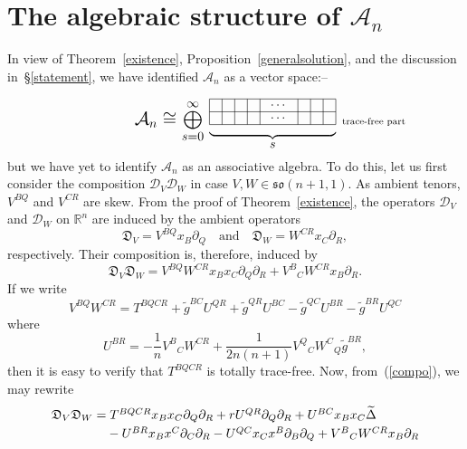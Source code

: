 \documentclass[a4paper,12pt]{amsart}
\begin{document}
\section{The algebraic structure of ${\mathcal A}_n$}
\label{algebraicstructure}
In view of Theorem~\ref{existence}, Proposition~\ref{generalsolution}, and the
discussion in~\S\ref{statement}, we have identified ${\mathcal A}_n$ as a
vector space:--
\begin{equation}\label{Aasvectorspace}\raisebox{5pt}
{\Large $\displaystyle{\mathcal A}_n\cong\bigoplus_{s=0}^\infty$}\;
\underbrace{\begin{picture}(100,30)
\put(0,5){\line(1,0){100}}
\put(0,15){\line(1,0){100}}
\put(0,25){\line(1,0){100}}
\put(0,5){\line(0,1){20}}
\put(10,5){\line(0,1){20}}
\put(20,5){\line(0,1){20}}
\put(30,5){\line(0,1){20}}
\put(40,5){\line(0,1){20}}
\put(70,5){\line(0,1){20}}
\put(80,5){\line(0,1){20}}
\put(90,5){\line(0,1){20}}
\put(100,5){\line(0,1){20}}
\put(55,10){\makebox(0,0){$\cdots$}}
\put(55,20){\makebox(0,0){$\cdots$}}
\put(105,7){\makebox(0,0)[l]{\scriptsize trace-free part}}
\end{picture}}_{\mbox{$s$}}\end{equation}
but we have yet to identify ${\mathcal A}_n$ as an associative algebra. To do
this, let us first consider the composition ${\mathcal D}_V{\mathcal D}_W$ in
case $V,W\in{\mathfrak{so}}(n+1,1)$. As ambient tenors, $V^{BQ}$ and $V^{CR}$
are skew. {From} the proof of Theorem~\ref{existence}, the operators
${\mathcal D}_V$ and ${\mathcal D}_W$ on ${\mathbb R}^n$ are induced by the
ambient operators
$${\mathfrak D}_V=V^{BQ}x_B\partial_Q\quad\mbox{and}\quad
{\mathfrak D}_W=W^{CR}x_C\partial_R,$$
respectively. Their composition is, therefore, induced by
\begin{equation}\label{compo}{\mathfrak D}_V{\mathfrak D}_W=
V^{BQ}W^{CR}x_Bx_C\partial_Q\partial_R+V^B{}_CW^{CR}x_B\partial_R.
\end{equation}
If we write
$$V^{BQ}W^{CR}=T^{BQCR}+\widetilde g^{BC}U^{QR}+\widetilde g^{QR}U^{BC}
-\widetilde g^{QC}U^{BR}-\widetilde g^{BR}U^{QC}$$
where
\begin{equation}\label{thisisU}U^{BR}=-\frac{1}{n}V^B{}_CW^{CR}
+\frac{1}{2n(n+1)}V^Q{}_CW^C{}_Q\widetilde g^{BR},\end{equation}
then it is easy to verify that $T^{BQCR}$ is totally trace-free.
Now, from~(\ref{compo}), we may rewrite
$$\begin{array}l{\mathfrak D}_V{\mathfrak D}_W=
T^{BQCR}x_Bx_C\partial_Q\partial_R
+rU^{QR}\partial_Q\partial_R+U^{BC}x_Bx_C\widetilde\Delta\\[3pt]
\phantom{{\mathfrak D}_V{\mathfrak D}_W=}
-U^{BR}x_Bx^C\partial_C\partial_R-U^{QC}x_Cx^B\partial_B\partial_Q
+V^B{}_CW^{CR}x_B\partial_R
\end{array}$$
\end{document}
